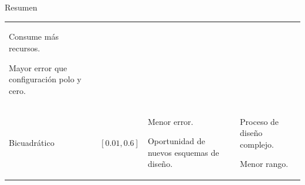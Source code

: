 \documentclass[10pt]{beamer}
\begin{document}
\begin{frame}
\begin{block}{Resumen}
\begin{scriptsize}
\begin{table}[!ht]
\begin{tabular}{>{\centering\arraybackslash}m{2cm} >{\centering\arraybackslash}m{1cm} >{\centering\arraybackslash}m{3cm} >{\centering\arraybackslash}m{3cm}}
\begin{itemize}[leftmargin=0cm,noitemsep]
	      \begin{scriptsize}
			\item[] Consume más recursos.
			\item[] Mayor error que configuración polo y cero.
	      \end{scriptsize}
	      \end{itemize}
	    \\ %
	     	Bicuadrático
	    &
	      $[0.01, 0.6]$
	    & 
	      \begin{itemize}[leftmargin=0cm,noitemsep]
	      \begin{scriptsize}
			\item[] Menor error.
			\item[] Oportunidad de nuevos esquemas de diseño.
	      \end{scriptsize}
	      \end{itemize}
	     & 
	      \begin{itemize}[leftmargin=0cm,noitemsep]
	      \begin{scriptsize}
			\item[] Proceso de diseño complejo.
			\item[] Menor rango.
	      \end{scriptsize}
	      \end{itemize}
	    \\ %
	    \hline
	  \end{tabular}
	\end{table}
		\end{scriptsize}
		\end{block}
	\end{frame}
\end{document}

